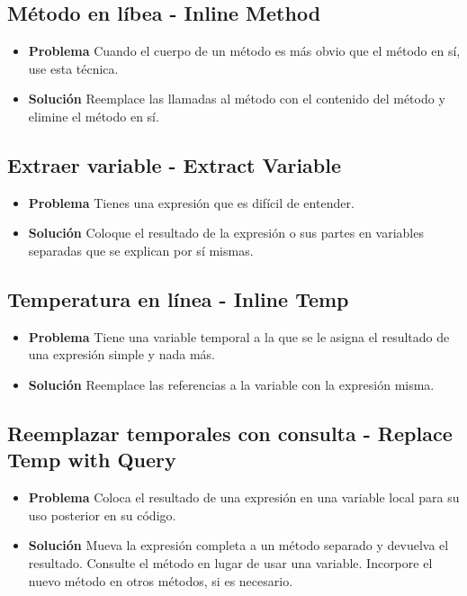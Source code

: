 \documentclass[11pt,a4paper,oneside]{book}
\begin{document}
\subsection{Método en líbea - Inline Method}
\label{inlinemethod}
\begin{itemize}
    \item \textbf{Problema} Cuando el cuerpo de un método es más obvio que el método en sí, use esta técnica.
    \item \textbf{Solución} Reemplace las llamadas al método con el contenido del método y elimine el método en sí.
\end{itemize}



\subsection{Extraer variable - Extract Variable}
\label{extracvariable}
\begin{itemize}
    \item \textbf{Problema} Tienes una expresión que es difícil de entender.
    \item \textbf{Solución} Coloque el resultado de la expresión o sus partes en variables separadas que se explican por sí mismas.
\end{itemize}


    
\subsection{Temperatura en línea - Inline Temp}
\label{inlinetemp}
\begin{itemize}
    \item \textbf{Problema} Tiene una variable temporal a la que se le asigna el resultado de una expresión simple y nada más.
    \item \textbf{Solución} Reemplace las referencias a la variable con la expresión misma.
\end{itemize}


    
\subsection{Reemplazar temporales con consulta - Replace Temp with Query}
\label{replacetempwithquery}
\begin{itemize}
    \item \textbf{Problema} Coloca el resultado de una expresión en una variable local para su uso posterior en su código.
    \item \textbf{Solución} Mueva la expresión completa a un método separado y devuelva el resultado. Consulte el método en lugar de usar una variable. Incorpore el nuevo método en otros métodos, si es necesario.
\end{itemize}


    
\end{document}

